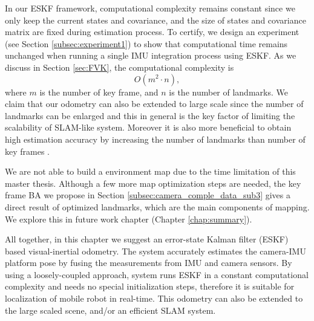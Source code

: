 In our ESKF framework, computational complexity remains constant since we only keep the current states and covariance, and the size of states and covariance matrix are fixed during estimation process. To certify, we design an experiment (see Section \ref{subsec:experiment1}) to show that computational time remains unchanged when running a single IMU integration process using ESKF. As we discuss in Section \ref{sec:FVK}, the computational complexity is 
\begin{equation}
	O(m^2 \cdot n),
\end{equation}
where $m$ is the number of key frame, and $n$ is the number of landmarks. We claim that our odometry can also be extended to large scale since the number of landmarks can be enlarged and this in general is the key factor of limiting the scalability of SLAM-like system. Moreover it is also more beneficial to obtain high estimation accuracy by increasing the number of landmarks than number of key frames \cite{strasdat2010real}.

We are not able to build a environment map due to the time limitation of this master thesis. Although a few more map optimization steps are needed, the key frame BA we propose in Section \ref{subsec:camera_comple_data_sub3} gives a direct result of optimized landmarks, which are the main components of mapping. We explore this in future work chapter (Chapter \ref{chap:summary}).

All together, in this chapter we suggest an error-state Kalman filter (ESKF) based visual-inertial odometry. The system accurately estimates the camera-IMU platform pose by fusing the measurements from IMU and camera sensors. By using a loosely-coupled approach, system runs ESKF in a constant computational complexity and needs no special initialization steps, therefore it is suitable for localization of mobile robot in real-time. This odometry can also be extended to the large scaled scene, and/or an efficient SLAM system.

